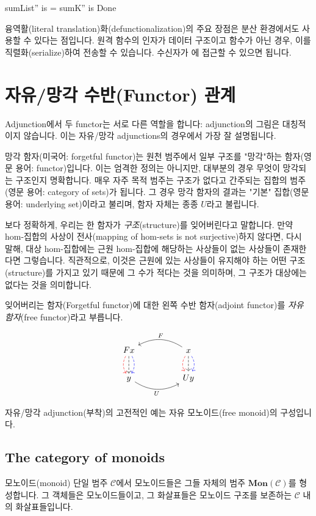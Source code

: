 \documentclass[DaoFP]{subfiles}
\begin{document}
\begin{haskell}
sumList'' is = sumK'' is Done
\end{haskell}

융역활(literal translation)화(defunctionalization)의 주요 장점은 분산 환경에서도 사용할 수 있다는 점입니다. 원격 함수의 인자가 데이터 구조이고 함수가 아닌 경우, 이를 직렬화(serialize)하여 전송할 수 있습니다. 수신자가 에 접근할 수 있으면 됩니다.

\section{자유/망각 수반(Functor) 관계}
Adjunction에서 두 functor는 서로 다른 역할을 합니다: adjunction의 그림은 대칭적이지 않습니다. 이는 자유/망각 adjunctions의 경우에서 가장 잘 설명됩니다.

망각 함자(미국어: forgetful functor)는 원천 범주에서 일부 구조를 "망각"하는 함자(영문 용어: functor)입니다. 이는 엄격한 정의는 아니지만, 대부분의 경우 무엇이 망각되는 구조인지 명확합니다. 매우 자주 목적 범주는 구조가 없다고 간주되는 집합의 범주(영문 용어: category of sets)가 됩니다. 그 경우 망각 함자의 결과는 "기본" 집합(영문 용어: underlying set)이라고 불리며, 함자 자체는 종종 $U$라고 불립니다.

보다 정확하게, 우리는 한 함자가 \emph{구조}(structure)를 잊어버린다고 말합니다. 만약 hom-집합의 사상이 전사(mapping of hom-sets is not surjective)하지 않다면, 다시 말해, 대상 hom-집합에는 근원 hom-집합에 해당하는 사상들이 없는 사상들이 존재한다면 그렇습니다. 직관적으로, 이것은 근원에 있는 사상들이 유지해야 하는 어떤 구조(structure)를 가지고 있기 때문에 그 수가 적다는 것을 의미하며, 그 구조가 대상에는 없다는 것을 의미합니다.

잊어버리는 함자(Forgetful functor)에 대한 왼쪽 수반 함자(adjoint functor)를 \emph{자유 함자}(free functor)라고 부릅니다.

\[
 \begin{tikzcd}
F x
\arrow[d, bend right, red, dashed]
\arrow[d, dashed]
\arrow[d, bend left, blue, dashed]
  &&
  x
\arrow[d, bend right, red, dashed]
\arrow[d, dashed]
\arrow[d, bend left, blue, dashed]
 \arrow[ll, bend right, "F"']
 \\
y
   \arrow[rr, bend right, "U"']
 &&
 U y
  \end{tikzcd}
\]

자유/망각 adjunction(부착)의 고전적인 예는 자유 모노이드(free monoid)의 구성입니다.


\subsection{The category of monoids}
모노이드(monoid) 단일 범주 $\mathcal{C}$에서 모노이드들은 그들 자체의 범주 $\mathbf{Mon}(\mathcal{C})$를 형성합니다. 그 객체들은 모노이드들이고, 그 화살표들은 모노이드 구조를 보존하는 $\mathcal{C}$ 내의 화살표들입니다.
\end{document}
